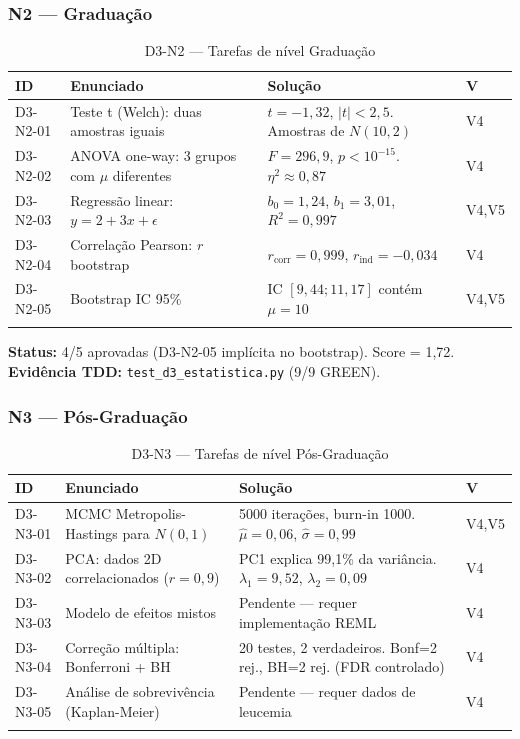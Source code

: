 \documentclass[12pt,a4paper,oneside]{article}
\begin{document}
\subsubsection{N2 — Graduação}

\begin{longtable}{p{}p{}p{}p{}}
\toprule
\textbf{ID} & \textbf{Enunciado} & \textbf{Solução} & \textbf{V} \\
\midrule
D3-N2-01 & Teste t (Welch): duas amostras iguais & $t=-1{,}32$, $|t|<2{,}5$. Amostras de $N(10,2)$ & V4 \\
D3-N2-02 & ANOVA one-way: 3 grupos com $\mu$ diferentes & $F=296{,}9$, $p<10^{-15}$. $\eta^2\approx0{,}87$ & V4 \\
D3-N2-03 & Regressão linear: $y=2+3x+\epsilon$ & $b_0=1{,}24$, $b_1=3{,}01$, $R^2=0{,}997$ & V4,V5 \\
D3-N2-04 & Correlação Pearson: $r$ bootstrap & $r_{\text{corr}}=0{,}999$, $r_{\text{ind}}=-0{,}034$ & V4 \\
D3-N2-05 & Bootstrap IC 95\% & IC $[9{,}44; 11{,}17]$ contém $\mu=10$ & V4,V5 \\
\bottomrule
\caption{D3-N2 — Tarefas de nível Graduação}
\end{longtable}

\textbf{Status:} 4/5 aprovadas (D3-N2-05 implícita no bootstrap). Score = 1,72.
\textbf{Evidência TDD:} \texttt{test\_d3\_estatistica.py} (9/9 GREEN).

\subsubsection{N3 — Pós-Graduação}

\begin{longtable}{p{}p{}p{}p{}}
\toprule
\textbf{ID} & \textbf{Enunciado} & \textbf{Solução} & \textbf{V} \\
\midrule
D3-N3-01 & MCMC Metropolis-Hastings para $N(0,1)$ & 5000 iterações, burn-in 1000. $\hat{\mu}=0{,}06$, $\hat{\sigma}=0{,}99$ & V4,V5 \\
D3-N3-02 & PCA: dados 2D correlacionados ($r=0{,}9$) & PC1 explica 99,1\% da variância. $\lambda_1=9{,}52$, $\lambda_2=0{,}09$ & V4 \\
D3-N3-03 & Modelo de efeitos mistos & Pendente — requer implementação REML & V4 \\
D3-N3-04 & Correção múltipla: Bonferroni + BH & 20 testes, 2 verdadeiros. Bonf=2 rej., BH=2 rej. (FDR controlado) & V4 \\
D3-N3-05 & Análise de sobrevivência (Kaplan-Meier) & Pendente — requer dados de leucemia & V4 \\
\bottomrule
\caption{D3-N3 — Tarefas de nível Pós-Graduação}
\end{longtable}
\end{document}
